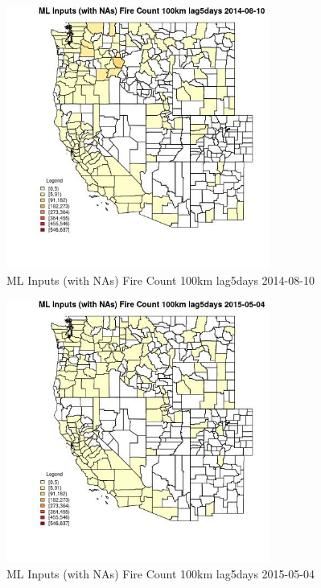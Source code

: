 \begin{figure} 
\centering  
\includegraphics[width=0.77\textwidth]{Code_Outputs/Report_ML_input_PM25_Step4_part_e_de_duplicated_aves_compiled_2019-05-18wNAs_CountyFire_Count_100km_lag5daysMean2014-08-10.jpg} 
\caption{\label{fig:Report_ML_input_PM25_Step4_part_e_de_duplicated_aves_compiled_2019-05-18wNAsCountyFire_Count_100km_lag5daysMean2014-08-10}ML Inputs (with NAs) Fire Count 100km lag5days 2014-08-10} 
\end{figure} 
 

\begin{figure} 
\centering  
\includegraphics[width=0.77\textwidth]{Code_Outputs/Report_ML_input_PM25_Step4_part_e_de_duplicated_aves_compiled_2019-05-18wNAs_CountyFire_Count_100km_lag5daysMean2015-05-04.jpg} 
\caption{\label{fig:Report_ML_input_PM25_Step4_part_e_de_duplicated_aves_compiled_2019-05-18wNAsCountyFire_Count_100km_lag5daysMean2015-05-04}ML Inputs (with NAs) Fire Count 100km lag5days 2015-05-04} 
\end{figure} 
 

